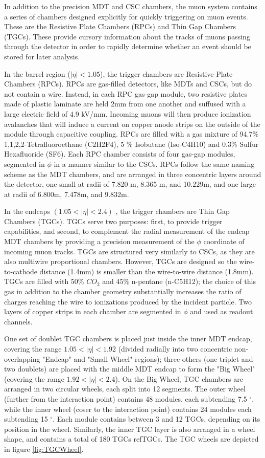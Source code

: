 In addition to the precision MDT and CSC chambers, the muon system contains a series of chambers designed explicitly for quickly triggering on muon events. These are the Resistive Plate Chambers (RPCs) and Thin Gap Chambers (TGCs). These provide cursory information about the tracks of muons passing through the detector in order to rapidly determine whether an event should be stored for later analysis.

In the barrel region ($| \eta | < 1.05 $), the trigger chambers are Resistive Plate Chambers (RPCs). RPCs are gas-filled detectors, like MDTs and CSCs, but do not contain a wire. Instead, in each RPC gas-gap module, two resistive plates made of plastic laminate are held 2mm from one another and suffused with a large electric field of 4.9 kV/mm. Incoming muons will then produce ionization avalanches that will induce a current on copper anode strips on the outside of the module through capacitive coupling. RPCs are filled with a gas mixture of 94.7\% 1,1,2,2-Tetrafluoroethane (C2H2F4), 5 \% Isobutane (Iso-C4H10) and 0.3\% Sulfur Hexafluoride (SF6). Each RPC chamber consists of four gas-gap modules, segmented in $\phi$ in a manner similar to the CSCs. RPCs follow the same naming scheme as the MDT chambers, and are arranged in three concentric layers around the detector, one small at radii of 7.820 m, 8.365 m, and 10.229m, and one large at radii of 6.800m, 7.478m, and 9.832m.

In the endcaps $(1.05 <|\eta| < 2.4)$ , the trigger chambers are Thin Gap Chambers (TGCs). TGCs serve two purposes: first, to provide trigger capabilities, and second, to complement the radial measurement of the endcap MDT chambers by providing a precision measurement of the $\phi$ coordinate of incoming muon tracks. TGCs are structured very similarly to CSCs, as they are also multiwire proportional chambers. However, TGCs are designed so the wire-to-cathode distance (1.4mm) is smaller than the wire-to-wire distance (1.8mm). TGCs are filled with 50\% $CO_2$ and 45\% n-pentane (n-C5H12); the choice of this gas in addition to the chamber geometry substantially increases the ratio of charges reaching the wire to ionizations produced by the incident particle. Two layers of copper strips in each chamber are segmented in $\phi$ and used as readout channels.

One set of doublet TGC chambers is placed just inside the inner MDT endcap, covering the range $ 1.05 < |\eta| <1.92 $ (divided radially into two concentric non-overlapping "Endcap" and "Small Wheel" regions); three others (one triplet and two doublets) are placed with the middle MDT endcap to form the "Big Wheel" (covering the range $ 1.92 < |\eta| < 2.4$). On the Big Wheel, TGC chambers are arranged in two circular wheels, each split into 12 segments. The outer wheel (further from the interaction point) contains 48 modules, each subtending 7.5 $^{\circ}$, while the inner wheel (coser to the interaction point) contains 24 modules each subtending 15 $^{\circ}$. Each module contains between 3 and 12 TGCs, depending on its position in the wheel. Similarly, the inner TGC layer is also arranged in a wheel shape, and contains a total of 180 TGCs ref{TGCs}. The TGC wheels are depicted in figure \ref{fig:TGCWheel}.

